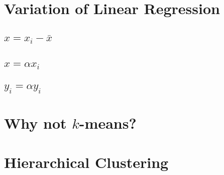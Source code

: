 \documentclass[11pt,a4paper]{article}
\begin{document}
\begin{titlepage}
    \maketitle
\end{titlepage}
\renewcommand{\contentsname}{Contents}
\begin{center} 
    \tableofcontents 
    \listoffigures
\end{center}
\newpage

\newcommand{\xii}{\ensuremath{x_i}}
\newcommand{\xbar}{\ensuremath{\bar{x}}}
\newcommand{\xihat}{\ensuremath{\hat{x}}}

\newcommand{\yii}{\ensuremath{y_i}}
\section{Variation of Linear Regression}
\subsection{$\xihat = \xii - \xbar$}

\subsection{$\xihat = \alpha \xii$}

\subsection{$\yii = \alpha \yii$}

\newpage
\section{Why not $k$-means?}

\newpage
\section{Hierarchical Clustering}

\end{document}
